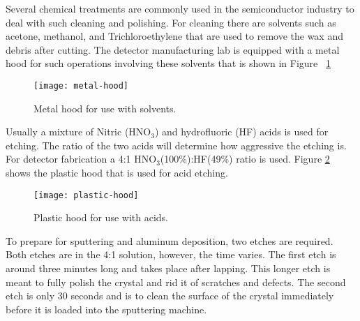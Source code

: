 Several chemical treatments are commonly used in the semiconductor industry to deal with such cleaning and polishing.
For cleaning there are solvents such as acetone, methanol, and Trichloroethylene that are used to remove the wax and debris after cutting.
The detector manufacturing lab is equipped with a metal hood for such operations involving these solvents that is shown in Figure ~\ref{fig:metalhood}
\begin{figure}[htpb]
\centering
\texttt{[image: metal-hood]}
\caption{Metal hood for use with solvents.}
\label{fig:metalhood}
\end{figure}

Usually a mixture of Nitric (HNO$_3$) and hydrofluoric (HF) acids is used for etching.
The ratio of the two acids will determine how aggressive the etching is.
For detector fabrication a 4:1 HNO$_3$(100\%):HF(49\%) ratio is used.
Figure \ref{fig:plastichood} shows the plastic hood that is used for acid etching.
\begin{figure}[htpb]
\centering
\texttt{[image: plastic-hood]}
\caption{Plastic hood for use with acids.}
\label{fig:plastichood}
\end{figure}
To prepare for sputtering and aluminum deposition, two etches are required.
Both etches are in the 4:1 solution, however, the time varies.
The first etch is around three minutes long and takes place after lapping.
This longer etch is meant to fully polish the crystal and rid it of scratches and defects.
The second etch is only 30 seconds and is to clean the surface of the crystal immediately before it is loaded into the sputtering machine.

